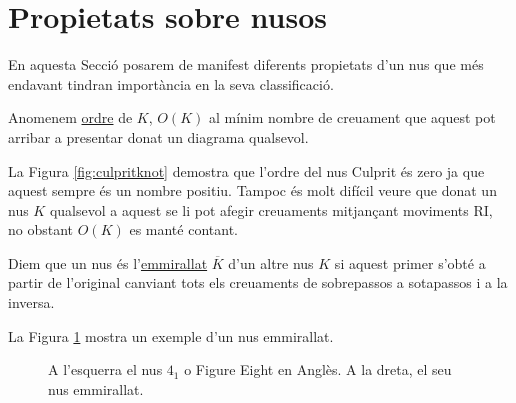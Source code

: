 
\section{Propietats sobre nusos}\label{sec:Propietats_sobre_nusos}

En aquesta Secció posarem de manifest diferents propietats d'un nus que més endavant tindran importància en la seva classificació.

\begin{definition}\label{def:ordre}
	Anomenem \underline{ordre} de $K$, $O(K)$ al mínim nombre de creuament que aquest pot arribar a presentar donat un diagrama qualsevol.
\end{definition}

La Figura \ref{fig:culpritknot} demostra que l'ordre del nus Culprit és zero ja que aquest sempre és un nombre positiu. Tampoc és molt difícil veure que donat un nus $K$ qualsevol a aquest se li pot afegir creuaments mitjançant moviments RI, no obstant $O(K)$ es manté contant.

\begin{definition}\label{def:nusemmirallat}
	Diem que un nus és l'\underline{emmirallat} $\overline{K}$ d'un altre nus $K$ si aquest primer s'obté a partir de l'original canviant tots els creuaments de sobrepassos a sotapassos i a la inversa.
\end{definition}

La Figura \ref{fig:nus emmirallat} mostra un exemple d'un nus emmirallat.\\

\begin{figure}
	\caption{A l'esquerra el nus $4_1$ o Figure Eight en Anglès. A la dreta, el seu nus emmirallat.}\label{fig:nus emmirallat}
\end{figure}

